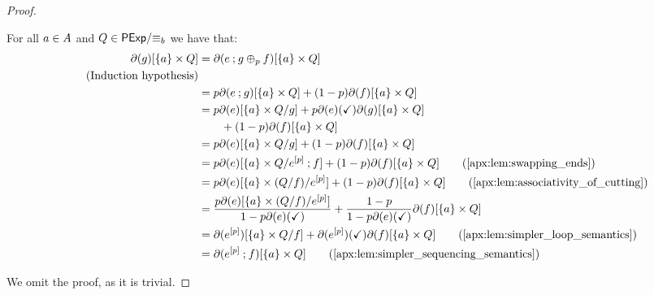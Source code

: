 \begin{proof}
\begin{itemize}[leftmargin=0em]
        For all $a \in {A}$ and $Q \in {\mathsf{PExp}}/{\equiv_b}$ we have that:
        \begin{align*}
            \partial(g)[\{a\} \times Q] &= \partial(e \seq g \oplus_p f)[\{a\} \times Q] \\\tag{Induction hypothesis} \\
            &=p \partial(e \seq g)[\{a\} \times Q] + (1-p)\partial(f)[\{a\} \times Q]\\
            &= p \partial(e)[\{a\} \times Q/{g}] + p \partial(e)(\checkmark)\partial(g)[\{a\}\times Q]\\&\quad\quad + (1-p)\partial(f)[\{a\} \times Q] \\
            &= p\partial(e)[\{a\} \times Q/g] + (1-p)\partial(f)[\{a\} \times Q] \\
            &=p\partial(e)[\{a\} \times Q/{e^{[p]}\seq f}] + (1-p)\partial(f)[\{a\} \times Q] \tag{\Cref{apx:lem:swapping_ends}}\\
            &=p\partial(e)[\{a\} \times {(Q/{f})}/{e^{[p]}}] + (1-p)\partial(f)[\{a\} \times Q] \tag{\Cref{apx:lem:associativity_of_cutting}}\\
            &=\frac{p\partial(e)[\{a\} \times {(Q/{f})}/{e^{[p]}}]}{1-p\partial(e)(\checkmark)} + \frac{1-p}{1-p\partial(e)(\checkmark)}\partial(f)[\{a\} \times Q] \\
            &= \partial(e^{[p]})[\{a\} \times Q/f] + \partial(e^{[p]})(\checkmark)\partial(f)[\{a\} \times Q] \tag{\Cref{apx:lem:simpler_loop_semantics}}\\
            &=\partial(e^{[p]}\seq f)[\{a\} \times Q] \tag{\Cref{apx:lem:simpler_sequencing_semantics}}
        \end{align*}
    \end{itemize}

    \item[]  We omit the proof, as it is trivial.


\end{proof}
